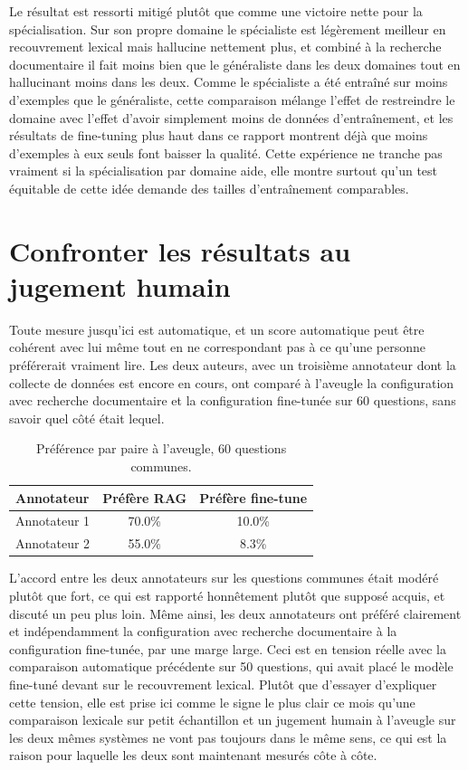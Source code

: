 \documentclass[11pt, a4paper]{article}
\begin{document}
Le r\'esultat est ressorti mitig\'e plut\^ot que comme une victoire nette pour la sp\'ecialisation. Sur son propre domaine le sp\'ecialiste est l\'eg\`erement meilleur en recouvrement lexical mais hallucine nettement plus, et combin\'e \`a la recherche documentaire il fait moins bien que le g\'en\'eraliste dans les deux domaines tout en hallucinant moins dans les deux. Comme le sp\'ecialiste a \'et\'e entra\^in\'e sur moins d'exemples que le g\'en\'eraliste, cette comparaison m\'elange l'effet de restreindre le domaine avec l'effet d'avoir simplement moins de donn\'ees d'entra\^inement, et les r\'esultats de fine-tuning plus haut dans ce rapport montrent d\'ej\`a que moins d'exemples \`a eux seuls font baisser la qualit\'e. Cette exp\'erience ne tranche pas vraiment si la sp\'ecialisation par domaine aide, elle montre surtout qu'un test \'equitable de cette id\'ee demande des tailles d'entra\^inement comparables.

\section{Confronter les r\'esultats au jugement humain}

Toute mesure jusqu'ici est automatique, et un score automatique peut \^etre coh\'erent avec lui m\^eme tout en ne correspondant pas \`a ce qu'une personne pr\'ef\'ererait vraiment lire. Les deux auteurs, avec un troisi\`eme annotateur dont la collecte de donn\'ees est encore en cours, ont compar\'e \`a l'aveugle la configuration avec recherche documentaire et la configuration fine-tun\'ee sur 60 questions, sans savoir quel c\^ot\'e \'etait lequel.

\begin{table}[H]
\centering
\small
\begin{tabular}{lcc}
\toprule
\textbf{Annotateur} & \textbf{Pr\'ef\`ere RAG} & \textbf{Pr\'ef\`ere fine-tune} \\
\midrule
Annotateur 1 & 70.0\% & 10.0\% \\
Annotateur 2 & 55.0\% & 8.3\% \\
\bottomrule
\end{tabular}
\caption{Pr\'ef\'erence par paire \`a l'aveugle, 60 questions communes.}
\label{tab:arena}
\end{table}

L'accord entre les deux annotateurs sur les questions communes \'etait mod\'er\'e plut\^ot que fort, ce qui est rapport\'e honn\^etement plut\^ot que suppos\'e acquis, et discut\'e un peu plus loin. M\^eme ainsi, les deux annotateurs ont pr\'ef\'er\'e clairement et ind\'ependamment la configuration avec recherche documentaire \`a la configuration fine-tun\'ee, par une marge large. Ceci est en tension r\'eelle avec la comparaison automatique pr\'ec\'edente sur 50 questions, qui avait plac\'e le mod\`ele fine-tun\'e devant sur le recouvrement lexical. Plut\^ot que d'essayer d'expliquer cette tension, elle est prise ici comme le signe le plus clair ce mois qu'une comparaison lexicale sur petit \'echantillon et un jugement humain \`a l'aveugle sur les deux m\^emes syst\`emes ne vont pas toujours dans le m\^eme sens, ce qui est la raison pour laquelle les deux sont maintenant mesur\'es c\^ote \`a c\^ote.
\end{document}
